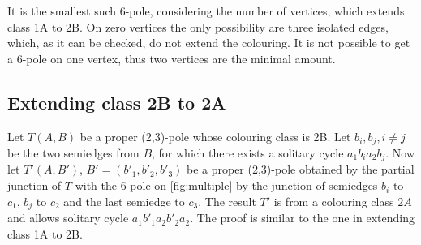 %		
%		

It is the smallest such 6-pole, considering the number of vertices, which extends class 1A to 2B. On zero vertices the only possibility are three isolated edges, which, as it can be checked, do not extend the colouring. It is not possible to get a 6-pole on one vertex, thus two vertices are the minimal amount.

\subsection{Extending class 2B to 2A}

Let $T(A,B)$ be a proper (2,3)-pole whose colouring class is 2B. Let $b_i,b_j,i\neq j$ be the two semiedges from $B$, for which there exists a solitary cycle $a_1b_ia_2b_j$. Now let $T'(A,B')$, $B'=(b'_1, b'_2, b'_3)$ be a proper (2,3)-pole obtained by the partial junction of $T$ with the 6-pole on \cref{fig:multiple} by the junction of semiedges $b_i$ to $c_1$, $b_j$ to $c_2$ and the last semiedge to $c_3$. The result $T'$ is from a colouring class $2A$ and allows solitary cycle $a_1b'_1a_2b'_2a_2$. The proof is similar to the one in extending class 1A to 2B.

%	


